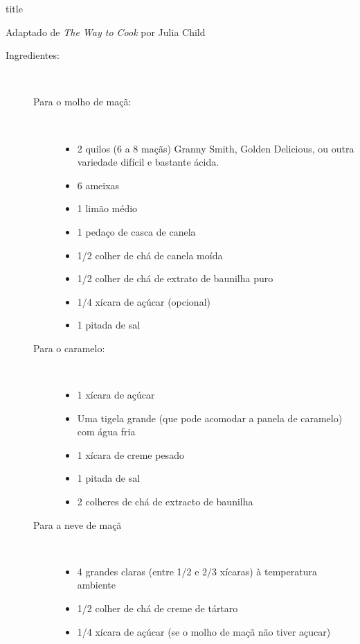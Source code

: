 \documentclass [11pt, letterpaper] {article}
\begin{document}
 {title}

\begin {flushright}
{Adaptado de {\it The Way to Cook} por Julia Child}
\end {flushright}


\vspace {0.3in}
\begin {description}

\item [Ingredientes:] \ \\
\begin {description}
\item [Para o molho de maçã:] \ \\
\begin {itemize}
\item 2 quilos (6 a 8 maçãs) Granny Smith, Golden Delicious, ou outra variedade difícil e bastante ácida.
\item 6 ameixas
\item 1 limão médio
\item 1 peda\c{c}o de casca de canela
\item 1/2 colher de chá de canela moída
\item 1/2 colher de chá de extrato de baunilha puro
\item 1/4 xícara de açúcar (opcional)
\item 1 pitada de sal
\end {itemize}
\item [Para o caramelo:] \ \\
\begin {itemize}
\item 1 xícara de açúcar
\item Uma tigela grande (que pode acomodar a panela de caramelo) com água fria
\item 1 xícara de creme pesado
\item 1 pitada de sal
\item 2 colheres de chá de extracto de baunilha
\end {itemize}
\item [Para a neve de ma\c{c}\~a] \ \\
\begin {itemize}
\item 4 grandes claras (entre 1/2 e 2/3 xícaras) à temperatura ambiente
\item 1/2 colher de chá de creme de tártaro
\item 1/4 xícara de açúcar (se o molho de maçã não tiver a\c{c}ucar)
\end {itemize}
\end {description}


\end{description}
\end{document}
